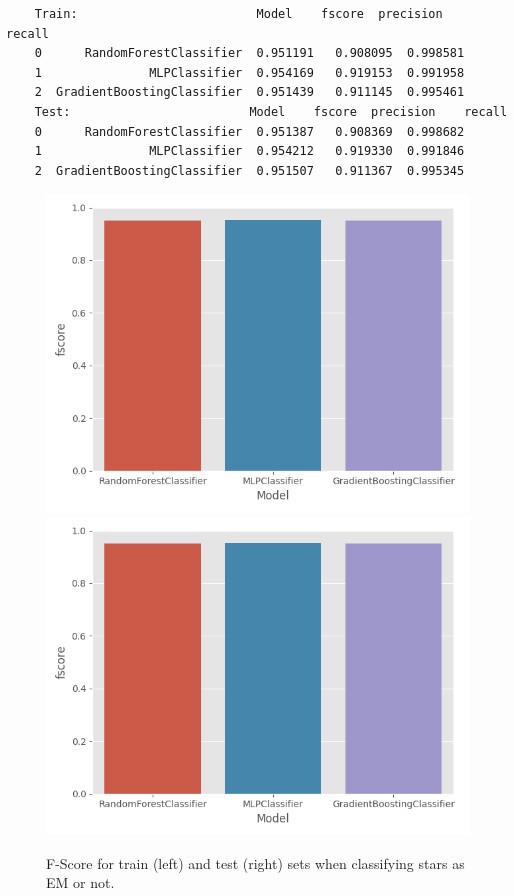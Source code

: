 \documentclass{article}
\begin{document}
\begin{verbatim}    
    Train:                         Model    fscore  precision    recall
    0      RandomForestClassifier  0.951191   0.908095  0.998581
    1               MLPClassifier  0.954169   0.919153  0.991958
    2  GradientBoostingClassifier  0.951439   0.911145  0.995461
    Test:                         Model    fscore  precision    recall
    0      RandomForestClassifier  0.951387   0.908369  0.998682
    1               MLPClassifier  0.954212   0.919330  0.991846
    2  GradientBoostingClassifier  0.951507   0.911367  0.995345
\end{verbatim}
    
\begin{figure}
    \includegraphics[width=0.49\linewidth]{plots/SKLearnClassifiers/aidelman_em_train_fscore.png}
    \includegraphics[width=0.49\linewidth]{plots/SKLearnClassifiers/aidelman_em_test_fscore.png}
    \caption{F-Score for train (left) and test (right) sets when classifying stars as EM or not.}
\end{figure}
\end{document}
